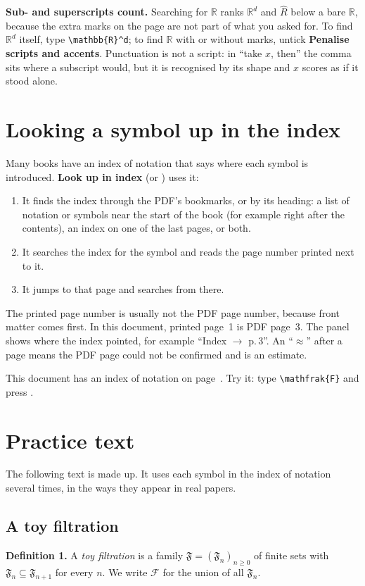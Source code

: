 \documentclass[11pt]{article}
\newcommand{\key}[1]{\fbox{\small\ttfamily #1}}
\begin{document}
\medskip\noindent\textbf{Sub- and superscripts count.} Searching for
$\mathbb{R}$ ranks $\mathbb{R}^d$ and $\hat{R}$ below a bare $\mathbb{R}$,
because the extra marks on the page are not part of what you asked for.
To find $\mathbb{R}^d$ itself, type \verb|\mathbb{R}^d|; to find
$\mathbb{R}$ with or without marks, untick \textbf{Penalise scripts and
accents}. Punctuation is not a script: in ``take $x$, then'' the comma sits
where a subscript would, but it is recognised by its shape and $x$ scores as
if it stood alone.

\section{Looking a symbol up in the index}\label{sec:lookup}

Many books have an index of notation that says where each symbol is
introduced. \textbf{Look up in index} (or \key{Ctrl+Enter}) uses it:
\begin{enumerate}
  \item It finds the index through the PDF's bookmarks, or by its heading:
        a list of notation or symbols near the start of the book (for
        example right after the contents), an index on one of the last
        pages, or both.
  \item It searches the index for the symbol and reads the page number
        printed next to it.
  \item It jumps to that page and searches from there.
\end{enumerate}
The printed page number is usually not the PDF page number, because front
matter comes first. In this document, printed page~1 is PDF page~3. The
panel shows where the index pointed, for example
``Index $\to$ p.\,3''. An ``$\approx$'' after a page means the PDF page
could not be confirmed and is an estimate.

This document has an index of notation on page~\pageref{sec:notation}. Try
it: type \verb|\mathfrak{F}| and press \key{Ctrl+Enter}.

\section{Practice text}\label{sec:practice}

The following text is made up. It uses each symbol in the index of notation
several times, in the ways they appear in real papers.

\subsection*{A toy filtration}
\textbf{Definition 1.}\label{def:frak} A \emph{toy filtration} is a family
$\mathfrak{F} = (\mathfrak{F}_n)_{n \ge 0}$ of finite sets with
$\mathfrak{F}_n \subseteq \mathfrak{F}_{n+1}$ for every $n$. We write
$\mathscr{F}$ for the union of all $\mathfrak{F}_n$.\label{def:scr}
\end{document}

